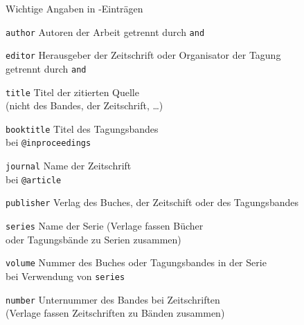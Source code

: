 \begin{Frame}{Wichtige Angaben in \BibTeX-Einträgen}
  \lstset{language=BibTeX}
  \begin{Block}{\lstinline-author-}
    Autoren der Arbeit\newline
    getrennt durch \lstinline-and-
  \end{Block}

  \begin{Block}{\lstinline-editor-}
    Herausgeber der Zeitschrift oder Organisator der Tagung\\
    getrennt durch \lstinline-and-
  \end{Block}

  \begin{Block}{\lstinline-title-}
    Titel der zitierten Quelle\\
    (nicht des Bandes, der Zeitschrift, \ldots)
  \end{Block}

  \framebreak

  \begin{Block}{\lstinline-booktitle-}
    Titel des Tagungsbandes\\
    bei \lstinline-@inproceedings-
  \end{Block}

  \begin{Block}{\lstinline-journal-}
    Name der Zeitschrift\\
    bei \lstinline-@article-
  \end{Block}

  \begin{Block}{\lstinline-publisher-}
    Verlag des Buches, der Zeitschift oder des Tagungsbandes
  \end{Block}

  \framebreak

  \begin{Block}{\lstinline-series-}
    Name der Serie (Verlage fassen Bücher\\
    oder Tagungsbände zu Serien zusammen)
  \end{Block}

  \begin{Block}{\lstinline-volume-}
    Nummer des Buches oder Tagungsbandes in der Serie\\
    bei Verwendung von \lstinline-series-
  \end{Block}

  \begin{Block}{\lstinline-number-}
    Unternummer des Bandes bei Zeitschriften\\
    (Verlage fassen Zeitschriften zu Bänden zusammen)
  \end{Block}


\end{Frame}
